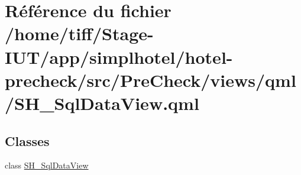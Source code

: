 \hypertarget{SH__SqlDataView_8qml}{\section{Référence du fichier /home/tiff/\-Stage-\/\-I\-U\-T/app/simplhotel/hotel-\/precheck/src/\-Pre\-Check/views/qml/\-S\-H\-\_\-\-Sql\-Data\-View.qml}
\label{SH__SqlDataView_8qml}
}
\subsection*{Classes}
\begin{DoxyCompactItemize}
\item 
class \hyperlink{classSH__SqlDataView}{S\-H\-\_\-\-Sql\-Data\-View}
\end{DoxyCompactItemize}
